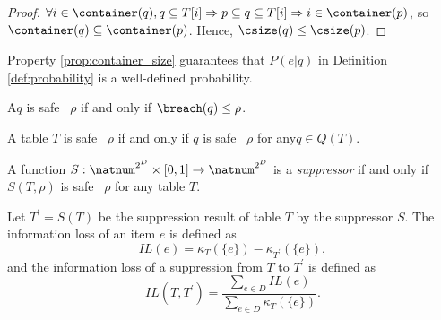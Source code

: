 \begin{proof}
  $\forall i\in\container(q), q\subseteq T[i]\Rightarrow p\subseteq q\subseteq T[i] \Rightarrow i\in\container(p)$,
  so $\container(q)\subseteq\container(p)$. Hence, $\csize(q)\leq \csize(p)$.
\end{proof}

Property \ref{prop:container_size} guarantees that $P(e|q)$ in Definition
\ref{def:probability} is a well-defined probability. 

\begin{definition}%
\label{def:safety_qid}
A\qid $q$ is safe \wrt~$\rho$ if and only if $\breach(q)\leq\rho$.
\end{definition}

\begin{definition}%
\label{def:safety_table}
A table $T$ is safe \wrt~$\rho$ if and only if $q$ is safe \wrt~$\rho$ for any\qid $q\in Q(T)$.
\end{definition}

\begin{definition}[Suppressor]
\label{def:suppressor}
A function $S : \natnum^{2^D}\times[0,1]\rightarrow\natnum^{2^D}$ is a \emph{suppressor} if and only if $S(T,\rho)$ is safe \wrt~$\rho$ for any table $T$.
\end{definition}

\begin{definition}
\label{def:infoloss}
Let $T^\prime = S(T)$ be the suppression result of table $T$ by the suppressor $S$.
The information loss of an item $e$ is defined as
\[ IL(e) = \kappa_T(\{e\}) - \kappa_{T^\prime}(\{e\}), \]
and the information loss of a suppression from $T$ to $T^\prime$ is defined as
\[ IL(T,T^\prime) = \frac{\sum_{e\in D}IL(e)}{\sum_{e\in D}\kappa_T(\{e\})}. \]
\end{definition}


